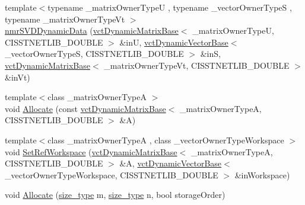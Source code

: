 \begin{DoxyCompactItemize}
\item 
{\footnotesize template$<$typename \-\_\-matrix\-Owner\-Type\-U , typename \-\_\-vector\-Owner\-Type\-S , typename \-\_\-matrix\-Owner\-Type\-Vt $>$ }\\\hyperlink{classnmr_s_v_d_dynamic_data_a366c5378160a8d0a1a4174cd21ae2692}{nmr\-S\-V\-D\-Dynamic\-Data} (\hyperlink{classvct_dynamic_matrix_base}{vct\-Dynamic\-Matrix\-Base}$<$ \-\_\-matrix\-Owner\-Type\-U, C\-I\-S\-S\-T\-N\-E\-T\-L\-I\-B\-\_\-\-D\-O\-U\-B\-L\-E $>$ \&in\-U, \hyperlink{classvct_dynamic_vector_base}{vct\-Dynamic\-Vector\-Base}$<$ \-\_\-vector\-Owner\-Type\-S, C\-I\-S\-S\-T\-N\-E\-T\-L\-I\-B\-\_\-\-D\-O\-U\-B\-L\-E $>$ \&in\-S, \hyperlink{classvct_dynamic_matrix_base}{vct\-Dynamic\-Matrix\-Base}$<$ \-\_\-matrix\-Owner\-Type\-Vt, C\-I\-S\-S\-T\-N\-E\-T\-L\-I\-B\-\_\-\-D\-O\-U\-B\-L\-E $>$ \&in\-Vt)
\item 
{\footnotesize template$<$class \-\_\-matrix\-Owner\-Type\-A $>$ }\\void \hyperlink{classnmr_s_v_d_dynamic_data_ae1d9a4869e753a1b838b14de75f1308f}{Allocate} (const \hyperlink{classvct_dynamic_matrix_base}{vct\-Dynamic\-Matrix\-Base}$<$ \-\_\-matrix\-Owner\-Type\-A, C\-I\-S\-S\-T\-N\-E\-T\-L\-I\-B\-\_\-\-D\-O\-U\-B\-L\-E $>$ \&A)
\item 
{\footnotesize template$<$class \-\_\-matrix\-Owner\-Type\-A , class \-\_\-vector\-Owner\-Type\-Workspace $>$ }\\void \hyperlink{classnmr_s_v_d_dynamic_data_a6940b17dbc208214e9cbecef8c4dd3b9}{Set\-Ref\-Workspace} (\hyperlink{classvct_dynamic_matrix_base}{vct\-Dynamic\-Matrix\-Base}$<$ \-\_\-matrix\-Owner\-Type\-A, C\-I\-S\-S\-T\-N\-E\-T\-L\-I\-B\-\_\-\-D\-O\-U\-B\-L\-E $>$ \&A, \hyperlink{classvct_dynamic_vector_base}{vct\-Dynamic\-Vector\-Base}$<$ \-\_\-vector\-Owner\-Type\-Workspace, C\-I\-S\-S\-T\-N\-E\-T\-L\-I\-B\-\_\-\-D\-O\-U\-B\-L\-E $>$ \&in\-Workspace)
\item 
void \hyperlink{classnmr_s_v_d_dynamic_data_aa65dc5751725c24564ea094609152c3b}{Allocate} (\hyperlink{classnmr_s_v_d_dynamic_data_ae1d183124f1fe39da05af9cea168101d}{size\-\_\-type} m, \hyperlink{classnmr_s_v_d_dynamic_data_ae1d183124f1fe39da05af9cea168101d}{size\-\_\-type} n, bool storage\-Order)
\item 

\end{DoxyCompactItemize}
